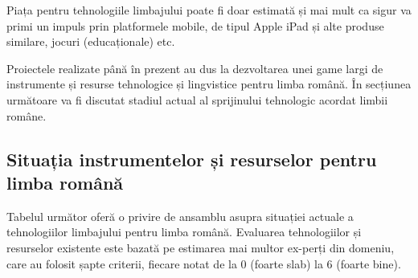 \begin{multicols}{2}
Piața pentru tehnologiile limbajului poate fi doar estimată și mai mult ca sigur va primi un impuls prin platformele mobile, de tipul Apple iPad și alte produse similare, jocuri (educaționale) etc.

Proiectele realizate până în prezent au dus la dezvoltarea unei game largi de instrumente și resurse tehnologice și lingvistice pentru limba română. În secțiunea următoare va fi discutat stadiul actual al sprijinului tehnologic acordat limbii române.

\subsection{Situația instrumentelor și resurselor pentru limba română}

Tabelul următor oferă o privire de ansamblu asupra situației actuale a tehnologiilor limbajului pentru limba română. Evaluarea tehnologiilor și resurselor existente este bazată pe estimarea mai multor ex-\newline perți din domeniu, care au folosit șapte criterii, fiecare notat de la 0 (foarte slab) la 6 (foarte bine).


\end{multicols}

